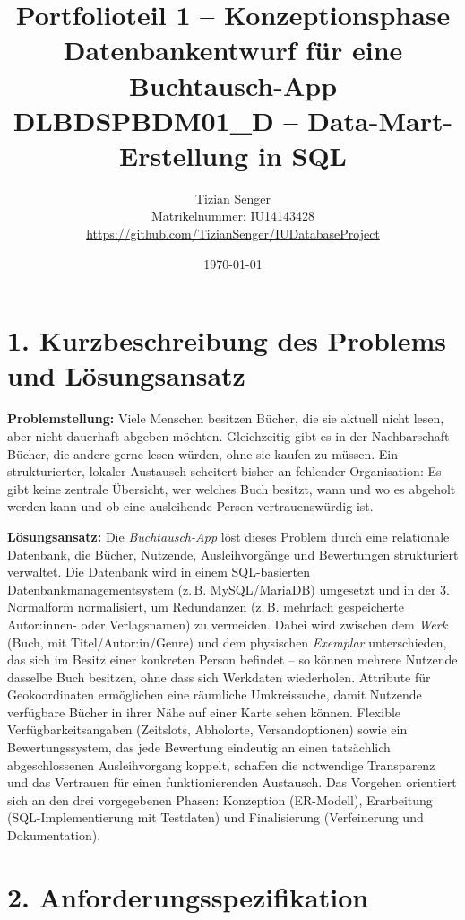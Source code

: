 \documentclass[11pt,a4paper]{article}
\title{\vspace{-1.5cm}\Large\textbf{Portfolioteil 1 -- Konzeptionsphase}\\[2pt]
\large Datenbankentwurf für eine Buchtausch-App\\[2pt]
\normalsize DLBDSPBDM01\_D -- Data-Mart-Erstellung in SQL}
\author{Tizian Senger \\ Matrikelnummer: IU14143428 \\ \url{https://github.com/TizianSenger/IUDatabaseProject}}
\date{\today}
\begin{document}
\maketitle
\vspace{-1.2cm}

\section*{1. Kurzbeschreibung des Problems und Lösungsansatz}

\textbf{Problemstellung:} Viele Menschen besitzen Bücher, die sie aktuell nicht lesen, aber nicht dauerhaft abgeben möchten. Gleichzeitig gibt es in der Nachbarschaft Bücher, die andere gerne lesen würden, ohne sie kaufen zu müssen. Ein strukturierter, lokaler Austausch scheitert bisher an fehlender Organisation: Es gibt keine zentrale Übersicht, wer welches Buch besitzt, wann und wo es abgeholt werden kann und ob eine ausleihende Person vertrauenswürdig ist.

\textbf{Lösungsansatz:} Die \emph{Buchtausch-App} löst dieses Problem durch eine relationale Datenbank, die Bücher, Nutzende, Ausleihvorgänge und Bewertungen strukturiert verwaltet. Die Datenbank wird in einem SQL-basierten Datenbankmanagementsystem (z.\,B. MySQL/MariaDB) umgesetzt und in der 3. Normalform normalisiert, um Redundanzen (z.\,B. mehrfach gespeicherte Autor:innen- oder Verlagsnamen) zu vermeiden. Dabei wird zwischen dem \emph{Werk} (Buch, mit Titel/Autor:in/Genre) und dem physischen \emph{Exemplar} unterschieden, das sich im Besitz einer konkreten Person befindet -- so können mehrere Nutzende dasselbe Buch besitzen, ohne dass sich Werkdaten wiederholen. Attribute für Geokoordinaten ermöglichen eine räumliche Umkreissuche, damit Nutzende verfügbare Bücher in ihrer Nähe auf einer Karte sehen können. Flexible Verfügbarkeitsangaben (Zeitslots, Abholorte, Versandoptionen) sowie ein Bewertungssystem, das jede Bewertung eindeutig an einen tatsächlich abgeschlossenen Ausleihvorgang koppelt, schaffen die notwendige Transparenz und das Vertrauen für einen funktionierenden Austausch. Das Vorgehen orientiert sich an den drei vorgegebenen Phasen: Konzeption (ER-Modell), Erarbeitung (SQL-Implementierung mit Testdaten) und Finalisierung (Verfeinerung und Dokumentation).

\section*{2. Anforderungsspezifikation}
\end{document}
